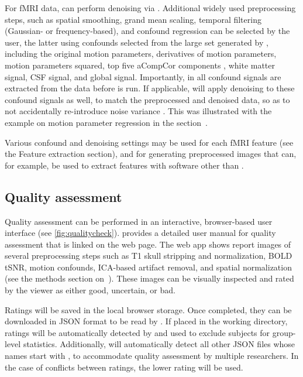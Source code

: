 For fMRI data,  can perform denoising via 
\citep{10.1016/j.neuroimage.2015.02.064}. Additional widely used
preprocessing steps, such as spatial smoothing, grand mean scaling,
temporal filtering (Gaussian- or frequency-based), and confound regression
can be selected by the user, the latter using confounds selected from the
large set generated by , including the original motion
parameters, derivatives of motion parameters, motion parameters squared,
top five aCompCor components \citep{10.1016/j.neuroimage.2007.04.042},
white matter signal, CSF signal, and global signal. Importantly, in
 all confound signals are extracted from the data before
 is run. If applicable,  will apply
denoising to these confound signals as well, to match the preprocessed and
denoised data, so as to not accidentally re-introduce noise variance
\citep{10.1016/j.neuroimage.2013.05.116,10.1002/hbm.24528}. This was
illustrated with the example on motion parameter regression in the
section~.

Various confound and denoising settings may be used for each fMRI feature
(see the Feature extraction section), and for generating preprocessed
images that can, for example, be used to extract features with software
other than .

\subsection{Quality assessment}

Quality assessment can be performed in an interactive, browser-based user
interface (see \autoref{fig:qualitycheck}).  provides a
detailed user manual for quality assessment that is linked on the web page.
The web app shows report images of several preprocessing steps such as T1
skull stripping and normalization, BOLD tSNR, motion confounds, ICA-based
artifact removal, and spatial normalization (see the methods section
on~). These images can be visually inspected and
rated by the viewer as either good, uncertain, or bad.

Ratings will be saved in the local browser storage. Once completed, they
can be downloaded in JSON format to be read by . If placed
in the working directory, ratings will be automatically detected by
 and used to exclude subjects for group-level statistics.
Additionally,  will automatically detect all other JSON
files whose names start with , to accommodate quality
assessment by multiple researchers. In the case of conflicts between
ratings, the lower rating will be used.

